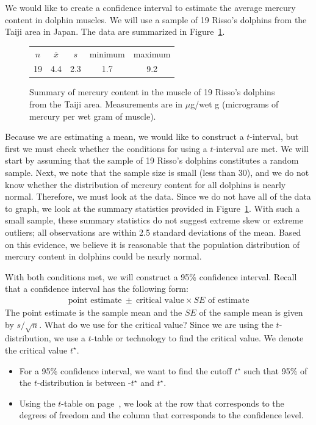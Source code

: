 We would like to create a confidence interval to estimate the average mercury content in dolphin muscles.  We will use a sample of 19 Risso's dolphins from the Taiji area in Japan.  The data are summarized in Figure~\ref{summaryStatsOfHgInMuscleOfRissosDolphins}. 

\begin{figure}[h]
\centering
\begin{tabular}{ccc cc}
\hline
$n$ & $\bar{x}$ & $s$ & minimum & maximum \\
19   & 4.4	  & 2.3  & 1.7	       & 9.2 \\
\hline
\end{tabular}
\caption{Summary of mercury content in the muscle of 19 Risso's dolphins from the Taiji area. Measurements are in $\mu$g/wet g (micrograms of mercury per wet gram of muscle).}
\label{summaryStatsOfHgInMuscleOfRissosDolphins}
\end{figure}

Because we are estimating a mean, we would like to construct a $t$-interval, but first we must check whether the conditions for using a $t$-interval are met.  We will start by assuming that the sample of 19 Risso's dolphins constitutes a random sample.  Next, we note that the sample size is small (less than 30), and we do not know whether the distribution of mercury content for all dolphins is nearly normal.  Therefore, we must look at the data.  Since we do not have all of the data to graph, we look at the summary statistics provided in Figure~\ref{summaryStatsOfHgInMuscleOfRissosDolphins}. With such a small sample, these summary statistics do not suggest extreme skew or extreme outliers; all observations are within 2.5 standard deviations of the mean. Based on this evidence, we believe it is reasonable that the population distribution of mercury content in dolphins could be nearly normal.  

\D{\newpage}

With both conditions met, we will construct a 95\% confidence interval.  Recall that a confidence interval has the following form:
\begin{eqnarray*}
\text{point estimate} \ \pm\  \text{critical value}\times SE\text{ of estimate}
\end{eqnarray*}
The point estimate is the sample mean and the $SE$ of the sample mean is given by $s/\sqrt{n}$.  What do we use for the critical value?  Since we are using the $t$-distribution, we use a $t$-table or technology to find the critical value.  We denote the critical value $t^{\star}$.
\begin{itemize}
\setlength{\itemsep}{0mm}
\item For a 95\% confidence interval, we want to find the cutoff $t^{\star}$ such that 95\% of the $t$-distribution is between -$t^{\star}$ and $t^{\star}$.
\item Using the $t$-table on page~\pageref{tTableSample_ch_inf_means}, we look at the row that corresponds to the degrees of freedom and the column that corresponds to the confidence level.
\end{itemize}

